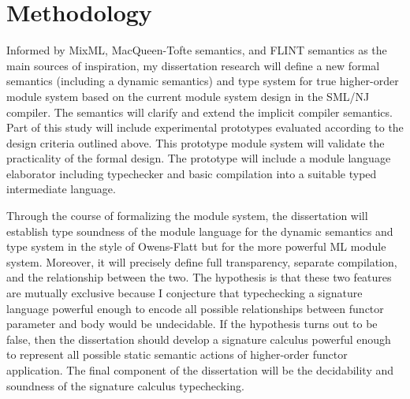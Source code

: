 \documentclass[12pt]{article}
\begin{document}
\section{Methodology}
	Informed by MixML, MacQueen-Tofte semantics, and FLINT semantics as the main sources of inspiration, my dissertation research will define a new formal semantics (including a dynamic semantics) and type system for true higher-order module system based on the current module system design in the SML/NJ compiler. The semantics will clarify and extend the implicit compiler semantics. Part of this study will include experimental prototypes evaluated according to the design criteria outlined above. This prototype module system will validate the practicality of the formal design. The prototype will include a module language elaborator including typechecker and basic compilation into a suitable typed intermediate language. 
	
	Through the course of formalizing the module system, the dissertation will establish type soundness of the module language for the dynamic semantics and type system in the style of Owens-Flatt but for the more powerful ML module system. Moreover, it will precisely define full transparency, separate compilation, and the relationship between the two. The hypothesis is that these two features are mutually exclusive because I conjecture that typechecking a signature language powerful enough to encode all possible relationships between functor parameter and body would be undecidable. If the hypothesis turns out to be false, then the dissertation should develop a signature calculus powerful enough to represent all possible static semantic actions of higher-order functor application. The final component of the dissertation will be the decidability and soundness of the signature calculus typechecking. 
\end{document}
